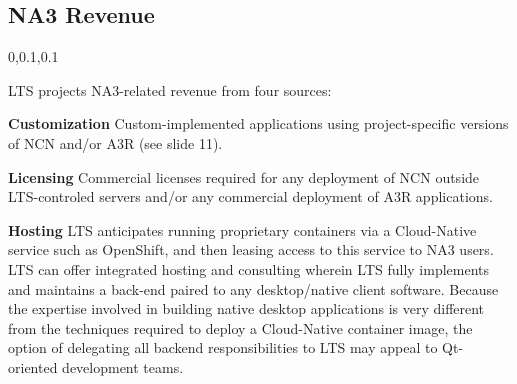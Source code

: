 
\begin{frame}{}
\section{NA3 Revenue}
\vspace{-.5em}	

{\Large{}\selectfont
\hspace*{-20pt}\begin{minipage}{1.08\textwidth}
\vspace{4pt}


		
\begin{lightquadblockc}{0,0.1,0.1}{\parbox{21cm}{\centering \vspace{10pt}LTS projects NA3-related 
		revenue from four sources:\vspace{3pt}}}
\begin{center}\begin{minipage}{\textwidth}
{\LARGE \setlength{\leftmargini}{30pt}\begin{enumerate}
\dmitem \textbf{Customization} \hspace{.5em} Custom-implemented applications 
using project-specific versions of NCN and/or A3R 
(see slide 11).

\dmitem \textbf{Licensing}  \hspace{.5em} Commercial licenses required for 
any deployment of NCN outside LTS-controled 
servers and/or any commercial deployment of A3R 
applications.

\dmitem \textbf{Hosting}  \hspace{.5em} LTS anticipates running proprietary 
containers via a Cloud-Native service such as 
OpenShift, and then leasing access to this service 
to NA3 users.  LTS can offer integrated hosting and consulting 
wherein LTS fully implements and maintains a back-end 
paired to any desktop/native client software.
Because the expertise involved 
in building native desktop applications is very different 
from the techniques required to deploy a Cloud-Native container 
image, the option of delegating all 
backend responsibilities to LTS may 
appeal to Qt-oriented development teams.


\end{enumerate}}
\end{minipage}
\end{center}
\end{lightquadblockc}
\end{minipage}}
\end{frame}
